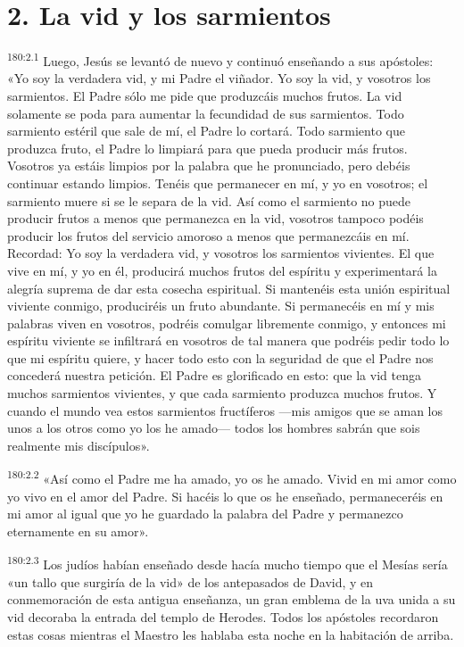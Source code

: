 \section*{2. La vid y los sarmientos}
\par 
\textsuperscript{180:2.1} Luego, Jesús se levantó de nuevo y continuó enseñando a sus apóstoles: «Yo soy la verdadera vid, y mi Padre el viñador. Yo soy la vid, y vosotros los sarmientos. El Padre sólo me pide que produzcáis muchos frutos. La vid solamente se poda para aumentar la fecundidad de sus sarmientos. Todo sarmiento estéril que sale de mí, el Padre lo cortará. Todo sarmiento que produzca fruto, el Padre lo limpiará para que pueda producir más frutos. Vosotros ya estáis limpios por la palabra que he pronunciado, pero debéis continuar estando limpios. Tenéis que permanecer en mí, y yo en vosotros; el sarmiento muere si se le separa de la vid. Así como el sarmiento no puede producir frutos a menos que permanezca en la vid, vosotros tampoco podéis producir los frutos del servicio amoroso a menos que permanezcáis en mí. Recordad: Yo soy la verdadera vid, y vosotros los sarmientos vivientes. El que vive en mí, y yo en él, producirá muchos frutos del espíritu y experimentará la alegría suprema de dar esta cosecha espiritual. Si mantenéis esta unión espiritual viviente conmigo, produciréis un fruto abundante. Si permanecéis en mí y mis palabras viven en vosotros, podréis comulgar libremente conmigo, y entonces mi espíritu viviente se infiltrará en vosotros de tal manera que podréis pedir todo lo que mi espíritu quiere, y hacer todo esto con la seguridad de que el Padre nos concederá nuestra petición. El Padre es glorificado en esto: que la vid tenga muchos sarmientos vivientes, y que cada sarmiento produzca muchos frutos. Y cuando el mundo vea estos sarmientos fructíferos ---mis amigos que se aman los unos a los otros como yo los he amado--- todos los hombres sabrán que sois realmente mis discípulos».

\par 
\textsuperscript{180:2.2} «Así como el Padre me ha amado, yo os he amado. Vivid en mi amor como yo vivo en el amor del Padre. Si hacéis lo que os he enseñado, permaneceréis en mi amor al igual que yo he guardado la palabra del Padre y permanezco eternamente en su amor».

\par 
\textsuperscript{180:2.3} Los judíos habían enseñado desde hacía mucho tiempo que el Mesías sería «un tallo que surgiría de la vid» de los antepasados de David, y en conmemoración de esta antigua enseñanza, un gran emblema de la uva unida a su vid decoraba la entrada del templo de Herodes. Todos los apóstoles recordaron estas cosas mientras el Maestro les hablaba esta noche en la habitación de arriba.

